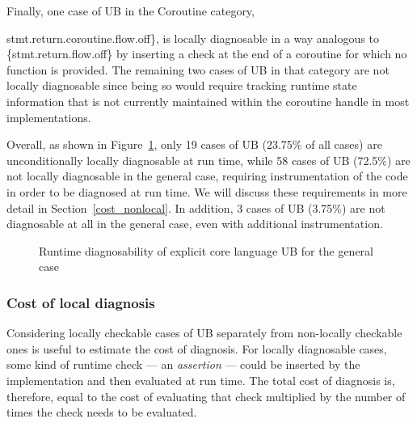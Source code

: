 Finally, one case of UB in the Coroutine category, {stmt.return.coroutine.flow.off\}, is locally diagnosable in a way analogous to \{stmt.return.flow.off\} by inserting a check at the end of a coroutine for which no  function is provided. The remaining two cases of UB in that category are not locally diagnosable since being so would require tracking runtime state information that is not currently maintained within the coroutine handle in most implementations. 

Overall, as shown in Figure~\ref{piechart_locally}, only 19 cases of UB (23.75\% of all cases) are unconditionally locally diagnosable at run time, while 58 cases of UB (72.5\%) are not locally diagnosable in the general case, requiring instrumentation of the code in order to be diagnosed at run time. We will discuss these requirements in more detail in Section~\ref{cost_nonlocal}. In addition, 3 cases of UB (3.75\%) are not diagnosable at all in the general case, even with additional instrumentation.

\vspace{5mm} %
\begin{figure}[t!]
    \centering
    \caption{Runtime diagnosability of explicit core language UB for the general case}
    \label{piechart_locally}
\end{figure}

\subsubsection{Cost of local diagnosis}
\label{cost_local}

Considering locally checkable cases of UB separately from non-locally checkable ones is useful to estimate the cost of diagnosis. For locally diagnosable cases, some kind of runtime check --- an \emph{assertion} --- could be inserted by the implementation and then evaluated at run time. The total cost of diagnosis is, therefore, equal to the cost of evaluating that check multiplied by the number of times the check needs to be evaluated.

}

